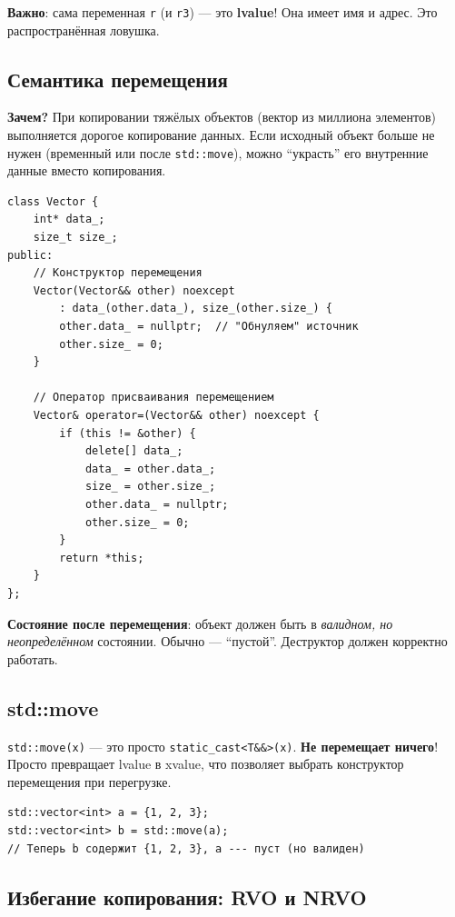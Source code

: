 \documentclass[12pt,a4paper]{article}
\begin{document}
\textbf{Важно}: сама переменная \texttt{r} (и \texttt{r3}) --- это \textbf{lvalue}! Она имеет имя и адрес. Это распространённая ловушка.

\subsection{Семантика перемещения}

\textbf{Зачем?} При копировании тяжёлых объектов (вектор из миллиона элементов) выполняется дорогое копирование данных. Если исходный объект больше не нужен (временный или после \texttt{std::move}), можно ``украсть'' его внутренние данные вместо копирования.

\begin{lstlisting}
class Vector {
    int* data_;
    size_t size_;
public:
    // Конструктор перемещения
    Vector(Vector&& other) noexcept
        : data_(other.data_), size_(other.size_) {
        other.data_ = nullptr;  // "Обнуляем" источник
        other.size_ = 0;
    }

    // Оператор присваивания перемещением
    Vector& operator=(Vector&& other) noexcept {
        if (this != &other) {
            delete[] data_;
            data_ = other.data_;
            size_ = other.size_;
            other.data_ = nullptr;
            other.size_ = 0;
        }
        return *this;
    }
};
\end{lstlisting}

\textbf{Состояние после перемещения}: объект должен быть в \textit{валидном, но неопределённом} состоянии. Обычно --- ``пустой''. Деструктор должен корректно работать.

\subsection{std::move}

\texttt{std::move(x)} --- это просто \texttt{static\_cast<T\&\&>(x)}. \textbf{Не перемещает ничего}! Просто превращает lvalue в xvalue, что позволяет выбрать конструктор перемещения при перегрузке.

\begin{lstlisting}
std::vector<int> a = {1, 2, 3};
std::vector<int> b = std::move(a);
// Теперь b содержит {1, 2, 3}, a --- пуст (но валиден)
\end{lstlisting}

\subsection{Избегание копирования: RVO и NRVO}
\end{document}
